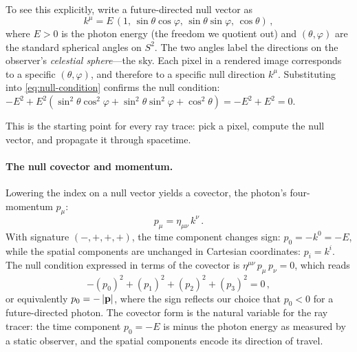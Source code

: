 To see this explicitly, write a future-directed null vector as
%
\begin{equation}
  k^\mu = E\,(1,\, \sin\theta\cos\varphi,\,
               \sin\theta\sin\varphi,\, \cos\theta) \,,
  \label{eq:null-parametrisation}
\end{equation}
%
where $E > 0$ is the photon energy (the freedom we quotient out) and $(\theta,
\varphi)$ are the standard spherical angles on $S^2$.  The two angles label the
directions on the observer's \emph{celestial sphere}---the sky.  Each pixel in
a rendered image corresponds to a specific $(\theta, \varphi)$, and therefore
to a specific null direction $k^\mu$.  Substituting into
\cref{eq:null-condition} confirms the null condition: $-E^2 + E^2(\sin^2\theta
\cos^2\varphi + \sin^2\theta\sin^2\varphi + \cos^2\theta) = -E^2 + E^2 = 0$.

This is the starting point for every ray trace: pick a pixel, compute
the null vector, and propagate it through spacetime.

\paragraph{The null covector and momentum.}

Lowering the index on a null vector yields a covector, the photon's
four-momentum $p_\mu$:
%
\begin{equation}
  p_\mu = \eta_{\mu\nu}\, k^\nu \,.
  \label{eq:photon-momentum}
\end{equation}
%
With signature $(-,+,+,+)$, the time component changes sign:
$p_0 = -k^0 = -E$, while the spatial components are unchanged in Cartesian
coordinates: $p_i = k^i$.  The null condition expressed in terms of the
covector is $\eta^{\mu\nu}\,p_\mu\,p_\nu = 0$, which reads
%
\begin{equation}
  -(p_0)^2 + (p_1)^2 + (p_2)^2 + (p_3)^2 = 0 \,,
  \label{eq:null-covector}
\end{equation}
%
or equivalently $p_0 = -\left\lvert \mathbf{p} \right\rvert$, where the sign reflects our choice
that $p_0 < 0$ for a future-directed photon.  The covector form is the natural
variable for the ray tracer: the time component $p_0 = -E$ is minus the photon
energy as measured by a static observer, and the spatial components encode its
direction of travel.

